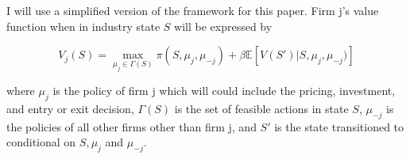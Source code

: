 \documentclass[12pt]{article}
\begin{document}






I will use a simplified version of the \citet{1995_Erickson_Pakes_RES} framework for this paper. Firm j's value function when in industry state $S$ will be expressed by

\begin{equation*}
  V_j(S)=\max_{\mu_j \in \Gamma(S)} \pi(S, \mu_j, \mu_{-j}) + \beta\mathbb{E}[V(S')|S,\mu_{j},\mu_{-j})]
\end{equation*}

where $\mu_j$ is the policy of firm j which will could include the pricing, investment, and entry or exit decision, $\Gamma(S)$ is the set of feasible actions in state $S$, $\mu_{-j}$ is the policies of all other firms other than firm j, and $S'$ is the state transitioned to conditional on $S,\mu_{j}$ and $\mu_{-j}$.
\end{document}
